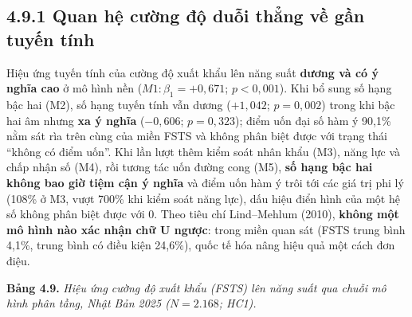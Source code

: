 \documentclass[
  a4paper,
  13pt]{extreport}
\begin{document}
\hypertarget{quan-hux1ec7-cux1b0ux1eddng-ux111ux1ed9-duux1ed7i-thux1eb3ng-vux1ec1-gux1ea7n-tuyux1ebfn-tuxednh}{%
\subsection{4.9.1 Quan hệ cường độ duỗi thẳng về gần tuyến
tính}\label{quan-hux1ec7-cux1b0ux1eddng-ux111ux1ed9-duux1ed7i-thux1eb3ng-vux1ec1-gux1ea7n-tuyux1ebfn-tuxednh}}

Hiệu ứng tuyến tính của cường độ xuất khẩu lên năng suất \textbf{dương
và có ý nghĩa cao} ở mô hình nền (\(M1: \beta_1 = +0{,}671\);
\(p < 0{,}001\)). Khi bổ sung số hạng bậc hai (M2), số hạng tuyến tính
vẫn dương (\(+1{,}042\); \(p = 0{,}002\)) trong khi bậc hai âm nhưng
\textbf{xa ý nghĩa} (\(-0{,}606\); \(p = 0{,}323\)); điểm uốn đại số hàm
ý 90,1\% nằm sát rìa trên cùng của miền FSTS và không phân biệt được với
trạng thái ``không có điểm uốn''. Khi lần lượt thêm kiểm soát nhân khẩu
(M3), năng lực và chấp nhận số (M4), rồi tương tác uốn đường cong (M5),
\textbf{số hạng bậc hai không bao giờ tiệm cận ý nghĩa} và điểm uốn hàm
ý trôi tới các giá trị phi lý (108\% ở M3, vượt 700\% khi kiểm soát năng
lực), dấu hiệu điển hình của một hệ số không phân biệt được với 0. Theo
tiêu chí Lind--Mehlum (2010), \textbf{không một mô hình nào xác nhận chữ
U ngược}: trong miền quan sát (FSTS trung bình 4,1\%, trung bình có điều
kiện 24,6\%), quốc tế hóa nâng hiệu quả một cách đơn điệu.

\textbf{Bảng 4.9.} \emph{Hiệu ứng cường độ xuất khẩu (FSTS) lên năng
suất qua chuỗi mô hình phân tầng, Nhật Bản 2025 (\(N = 2.168\); HC1).}
\end{document}
